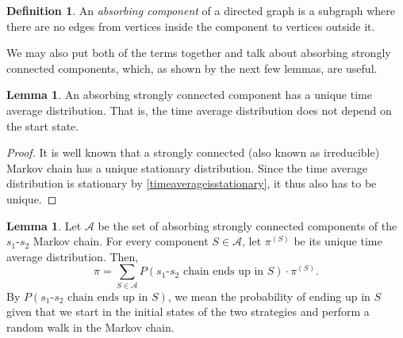 \documentclass[12pt]{article}
\theoremstyle{definition}
\newtheorem{definition}[theorem]{Definition}
\newtheorem{lemma}[theorem]{Lemma}
\theoremstyle{remark}
\begin{document}
\begin{definition}
  An \textit{absorbing component} of a directed graph is a subgraph where there are no edges from vertices inside the component to vertices outside it.
\end{definition}

We may also put both of the terms together and talk about absorbing strongly connected components, which, as shown by the next few lemmas, are useful.

\begin{lemma}
  \label{lemmaabsorbinghasuniquetimeaverage}
  An absorbing strongly connected component has a unique time average distribution. That is, the time average distribution does not depend on the start state.
\end{lemma}

\begin{proof}
  It is well known that a strongly connected (also known as irreducible) Markov chain has a unique stationary distribution. Since the time average distribution is stationary by \cref{timeaverageisstationary}, it thus also has to be unique.
\end{proof}

\begin{lemma}
  \label{timeaveragedistributiondecomposition}
  Let $\mathcal{A}$ be the set of absorbing strongly connected components of the $s_1$-$s_2$ Markov chain. For every component $S \in \mathcal{A}$, let $\pi^{(S)}$ be its unique time average distribution. Then,
  \begin{equation*}
    \pi = \sum_{S \in \mathcal{A}} P(\text{$s_1$-$s_2$ chain ends up in $S$}) \cdot \pi^{(S)}.
  \end{equation*}
  By $P(s_1\text{-}s_2 \text{ chain ends up in } S)$, we mean the probability of ending up in $S$ given that we start in the initial states of the two strategies and perform a random walk in the Markov chain.
\end{lemma}
\end{document}
